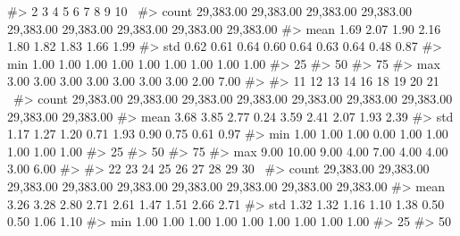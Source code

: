 \begin{Schunk}
\begin{Soutput}
#>               2         3         4         5         6         7         8         9        10  \
#> count 29,383.00 29,383.00 29,383.00 29,383.00 29,383.00 29,383.00 29,383.00 29,383.00 29,383.00   
#> mean       1.69      2.07      1.90      2.16      1.80      1.82      1.83      1.66      1.99   
#> std        0.62      0.61      0.64      0.60      0.64      0.63      0.64      0.48      0.87   
#> min        1.00      1.00      1.00      1.00      1.00      1.00      1.00      1.00      1.00   
#> 25%
#> 50%
#> 75%
#> max        3.00      3.00      3.00      3.00      3.00      3.00      3.00      2.00      7.00   
#> 
#>              11        12        13        14        16        18        19        20        21  \
#> count 29,383.00 29,383.00 29,383.00 29,383.00 29,383.00 29,383.00 29,383.00 29,383.00 29,383.00   
#> mean       3.68      3.85      2.77      0.24      3.59      2.41      2.07      1.93      2.39   
#> std        1.17      1.27      1.20      0.71      1.93      0.90      0.75      0.61      0.97   
#> min        1.00      1.00      1.00      0.00      1.00      1.00      1.00      1.00      1.00   
#> 25%
#> 50%
#> 75%
#> max        9.00     10.00      9.00      4.00      7.00      4.00      4.00      3.00      6.00   
#> 
#>              22        23        24        25        26        27        28        29        30  \
#> count 29,383.00 29,383.00 29,383.00 29,383.00 29,383.00 29,383.00 29,383.00 29,383.00 29,383.00   
#> mean       3.26      3.28      2.80      2.71      2.61      1.47      1.51      2.66      2.71   
#> std        1.32      1.32      1.16      1.10      1.38      0.50      0.50      1.06      1.10   
#> min        1.00      1.00      1.00      1.00      1.00      1.00      1.00      1.00      1.00   
#> 25%
#> 50%

\end{Soutput}
\end{Schunk}
